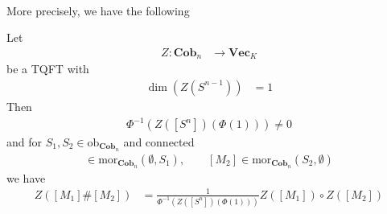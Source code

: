 \\
More precisely, we have the following
\\
\begin{thm}
\label{thm:consum}
Let
\begin{align*}
  Z
  \colon
  \mathbf{Cob}_{n}
  &\to
  \mathbf{Vec}_{K}
\end{align*}
be a TQFT with
\begin{align*}
  \dim(Z(S^{n-1}))
  &=
  1
\end{align*}
Then
\begin{align*}
\Phi^{-1}(Z([S^{n}])(\Phi(1))) \neq 0
\end{align*}
and for $S_{1},S_{2} \in \mathrm{ob}_{\mathbf{Cob}_{n}}$ and connected
\begin{align*}
  [M_{1}]
  \in
  \mathrm{mor}_{\mathbf{Cob}_{n}}(\emptyset,S_{1})
  ,\qquad
  [M_{2}]
  \in
  \mathrm{mor}_{\mathbf{Cob}_{n}}(S_{2},\emptyset)
\end{align*}
we have
\begin{align*}
  Z([M_{1}] \# [M_{2}])
  &=
  \frac{1}{\Phi^{-1}(Z([S^{n}])(\Phi(1)))}
  Z([M_{1}])
  \circ
  Z([M_{2}])
\end{align*}
\end{thm}
